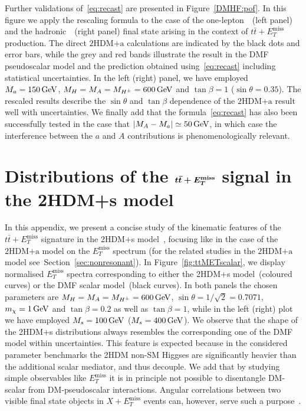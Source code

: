 \documentclass[a4paper, 11pt,notoc]{article}
\newcommand{\MET}{\ensuremath{E_T^\mathrm{miss}}\xspace}
\newcommand{\mA}{\ensuremath{M_{A}}\xspace}
\newcommand{\ma}{\ensuremath{M_{a}}\xspace}
\newcommand{\mH}{\ensuremath{M_{H}}\xspace}
\newcommand{\mHc}{\ensuremath{M_{H^{\pm}}}\xspace}
\newcommand{\hdma}{\ensuremath{\textrm{2HDM+a}}\xspace}
\def\bm#1{\mbox{\boldmath$#1$\unboldmath}}
\begin{document}
Further validations of~\eqref{eq:recast} are presented in Figure~\ref{DMHF:pof}. In this figure we apply the rescaling formula to the case of the  one-lepton~\cite{Aaboud:2017aeu}~(left panel)   and the hadronic~\cite{Aaboud:2017rzf}~(right panel)  final state arising in the context of $t \bar t+\MET$ production. The direct \hdma calculations are indicated by the black dots and error bars, while the grey and red  bands illustrate the result in the DMF pseudoscalar model and the prediction obtained using~\eqref{eq:recast} including statistical uncertainties.  In the left (right) panel, we have employed $\ma = 150 \, {\rm GeV}$, $\mH= \mA = \mHc = 600 \, {\rm GeV}$ and $\tan \beta = 1$ ($\sin\theta=0.35$). The rescaled results describe the $\sin \theta$ and $\tan \beta$ dependence of the \hdma result well with uncertainties.  We finally add that the formula~\eqref{eq:recast} has also been successfully tested in the case that $|\mA - \ma| \simeq 50 \, {\rm GeV}$, in which case the interference between the $a$ and $A$ contributions is phenomenologically relevant.  


\section{Distributions of the $\bm{t \bar t + \MET}$ signal in the 2HDM+s model}
\label{app:ttMETscalar}

In this appendix, we present a concise study of the kinematic features of the  $t \bar t + \MET$ signature in the 2HDM+s model~\cite{Bell:2016ekl,Bell:2017rgi}, focusing like in the case of the  \hdma model on the $\MET$ spectrum (for the related studies in the \hdma model see~Section~\ref{sec:nonresonant}).  In Figure~\ref{fig:ttMETscalar}, we display normalised $\MET$ spectra corresponding to either  the 2HDM+s model~(coloured curves) or the DMF scalar   model~(black curves). In both panels the chosen parameters are $M_H = M_A = M_{H^\pm} = 600 \, {\rm GeV}$, $\sin\theta=1/\sqrt{2}=0.7071$, $m_\chi = 1 \, {\rm GeV}$ and $\tan \beta = 0.2$ as well as $\tan \beta = 1$, while in the left (right) plot we have employed $M_s = 100 \, {\rm GeV}$ ($M_s = 400 \, {\rm GeV}$). We observe that  the shape of the 2HDM+s distributions always  resembles  the corresponding one of the DMF model within uncertainties. This feature is expected because in the considered parameter benchmarks the 2HDM non-SM Higgses are significantly heavier than the additional scalar mediator, and thus decouple. We add that by studying simple observables like $\MET$ it is in principle not possible to disentangle DM-scalar from DM-pseudoscalar interactions. Angular correlations between  two visible final state objects in $X+\MET$ events can, however, serve such a purpose~\cite{Haisch:2016gry,Cotta:2012nj,Haisch:2013fla,Crivellin:2015wva}. 
\end{document}
